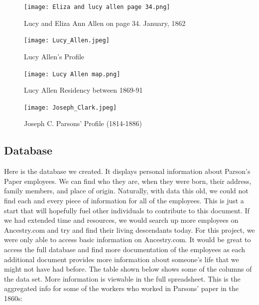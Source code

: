 \documentclass[
  letterpaper,
  DIV=11,
  numbers=noendperiod]{scrartcl}
\begin{document}
\begin{figure}

{\centering \texttt{[image: Eliza and lucy allen page 34.png]}

}

\caption{\label{fig-sample5}Lucy and Eliza Ann Allen on page 34.
January, 1862}

\end{figure}

\begin{figure}

{\centering \texttt{[image: Lucy\_Allen.jpeg]}

}

\caption{\label{fig-sample6}Lucy Allen's Profile}

\end{figure}

\begin{figure}

{\centering \texttt{[image: Lucy Allen map.png]}

}

\caption{\label{fig-sample7}Lucy Allen Residency between 1869-91}

\end{figure}

\begin{figure}

{\centering \texttt{[image: Joseph\_Clark.jpeg]}

}

\caption{\label{fig-sample8}Joseph C. Parsons' Profile (1814-1886)}

\end{figure}

\clearpage

\hypertarget{database}{%
\subsection{Database}\label{database}}

Here is the database we created. It displays personal information about
Parson's Paper employees. We can find who they are, when they were born,
their address, family members, and place of origin. Naturally, with data
this old, we could not find each and every piece of information for all
of the employees. This is just a start that will hopefully fuel other
individuals to contribute to this document. If we had extended time and
resources, we would search up more employees on Ancestry.com and try and
find their living descendants today. For this project, we were only able
to access basic information on Ancestry.com. It would be great to access
the full database and find more documentation of the employees as each
additional document provides more information about someone's life that
we might not have had before. The table shown below shows some of the
columns of the data set. More information is viewable in the full
spreadsheet. This is the aggregated info for some of the workers who
worked in Parsons' paper in the 1860s:
\end{document}
